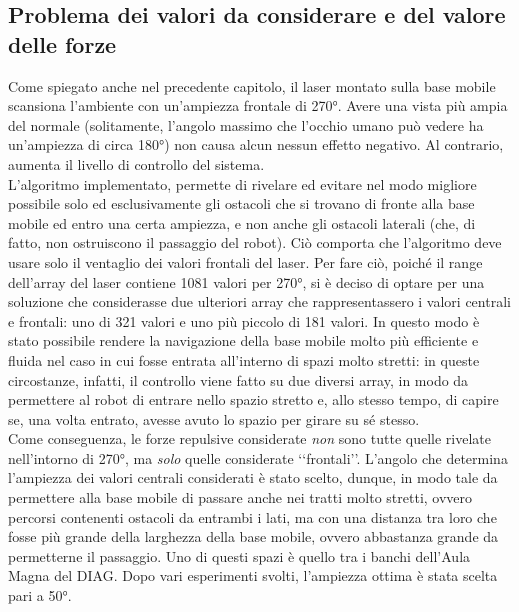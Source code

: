 \subsection{Problema dei valori da considerare e del valore delle forze}
Come spiegato anche nel precedente capitolo, il laser montato sulla base mobile scansiona l’ambiente con un'ampiezza frontale di 270°. Avere una vista più ampia del normale (solitamente, l'angolo massimo che l'occhio umano può vedere ha un’ampiezza di circa 180°) non causa alcun nessun effetto negativo. Al contrario, aumenta il livello di controllo del sistema.\\
L’algoritmo implementato, permette di rivelare ed evitare nel modo migliore possibile solo ed esclusivamente gli ostacoli che si trovano di fronte alla base mobile ed entro una certa ampiezza, e non anche gli ostacoli laterali (che, di fatto, non ostruiscono il passaggio del robot). Ciò comporta che l’algoritmo deve usare solo il ventaglio dei valori frontali del laser. Per fare ciò, poiché il range dell’array del laser contiene 1081 valori per 270°, si è deciso di optare per una soluzione che considerasse due ulteriori array che rappresentassero i valori centrali e frontali: uno di 321 valori e uno più piccolo di 181 valori. In questo modo è stato possibile rendere la navigazione della base mobile molto più efficiente e fluida nel caso in cui fosse entrata all'interno di spazi molto stretti: in queste circostanze, infatti, il controllo viene fatto su due diversi array, in modo da permettere al robot di entrare nello spazio stretto e, allo stesso tempo, di capire se, una volta entrato, avesse avuto lo spazio per girare su sé stesso.\\
Come conseguenza, le forze repulsive considerate \textit{non} sono tutte quelle rivelate nell’intorno di 270°, ma \textit{solo} quelle considerate ‘‘frontali’’.
L’angolo che determina l’ampiezza dei valori centrali considerati è stato scelto, dunque, in modo tale da permettere alla base mobile di passare anche nei tratti molto stretti, ovvero percorsi contenenti ostacoli da entrambi i lati, ma con una distanza tra loro che fosse più grande della larghezza della base mobile, ovvero abbastanza grande da permetterne il passaggio. Uno di questi spazi è quello tra i banchi dell’Aula Magna del DIAG. Dopo vari esperimenti svolti, l’ampiezza ottima è stata scelta pari a 50°.\\
